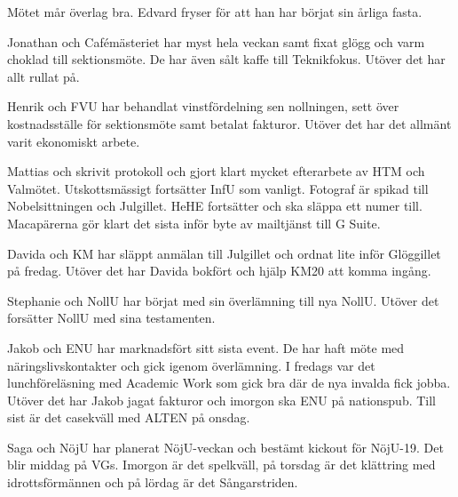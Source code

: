 \documentclass[10pt]{article}
\begin{document}
\begin{paragrafer}
\begin{fyllnadsval} %


\end{fyllnadsval}

\begin{paragrafer}
Mötet mår överlag bra. Edvard fryser för att han har börjat sin årliga fasta. 



Jonathan och Cafémästeriet har myst hela veckan samt fixat glögg och varm choklad till sektionsmöte.
De har även sålt kaffe till Teknikfokus. Utöver det har allt rullat på.

Henrik och FVU har behandlat vinstfördelning sen nollningen, sett över kostnadsställe för sektionsmöte samt betalat fakturor. Utöver det har det allmänt varit ekonomiskt arbete. 

Mattias och skrivit protokoll och gjort klart mycket efterarbete av HTM och Valmötet. Utskottsmässigt fortsätter InfU som vanligt. Fotograf är spikad till Nobelsittningen och Julgillet. HeHE fortsätter och ska släppa ett numer till. Macapärerna gör klart det sista inför byte av mailtjänst till G Suite. 

Davida och KM har släppt anmälan till Julgillet och ordnat lite inför Glöggillet på fredag. Utöver det har Davida bokfört och hjälp KM20 att komma ingång. 

Stephanie och NollU har börjat med sin överlämning till nya NollU. Utöver det forsätter NollU med sina testamenten. 

Jakob och ENU har marknadsfört sitt sista event. De har haft möte med näringslivskontakter och gick igenom överlämning. I fredags var det lunchföreläsning med Academic Work som gick bra där de nya invalda fick jobba. Utöver det har Jakob jagat fakturor och imorgon ska ENU på nationspub. Till sist är det casekväll med ALTEN på onsdag.

Saga och NöjU har planerat NöjU-veckan och bestämt kickout för NöjU-19. Det blir middag på VGs. Imorgon är det spelkväll, på torsdag är det klättring med idrottsförmännen och på lördag är det Sångarstriden. 


\end{paragrafer}
\end{paragrafer}
\end{document}
